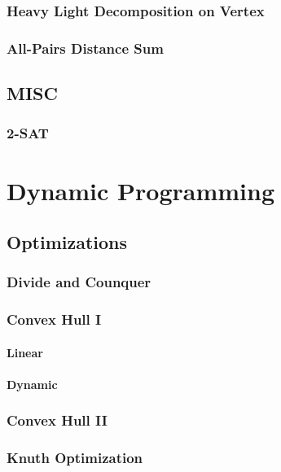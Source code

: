\documentclass[10pt,a4paper]{report}
\begin{document}
		\subsection{Heavy Light Decomposition on Vertex}
		\subsection{All-Pairs Distance Sum}
		
	\section{MISC}
		\subsection{2-SAT}
		
\chapter{Dynamic Programming}

	\section{Optimizations}
		\subsection{Divide and Counquer}
			
		\subsection{Convex Hull I}
			\subsubsection{Linear}
				
			\subsubsection{Dynamic}
				
		\subsection{Convex Hull II}
		\subsection{Knuth Optimization}
\end{document}
